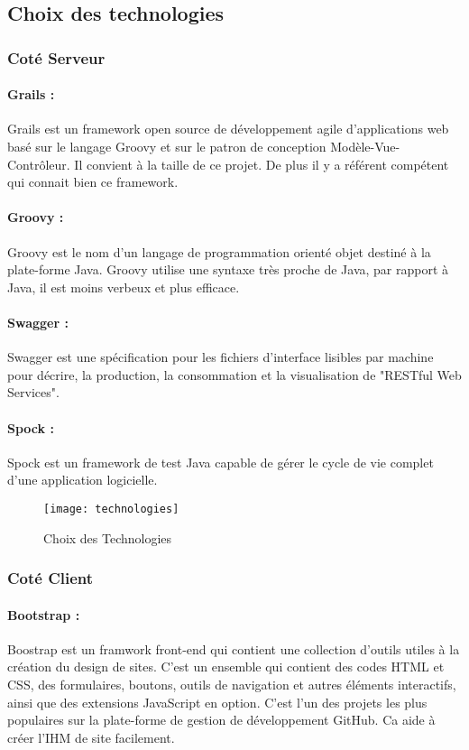 \subsection{Choix des technologies}

\subsubsection{Coté Serveur}

\paragraph{Grails :}
Grails est un framework open source de développement agile d'applications web basé sur le langage Groovy et sur le patron de conception Modèle-Vue-Contrôleur.
Il convient à la taille de ce projet.
De plus il y a référent compétent qui connait bien ce framework.
\paragraph{Groovy :}
Groovy est le nom d'un langage de programmation orienté objet destiné à la plate-forme Java.
Groovy utilise une syntaxe très proche de Java, par rapport à Java, il est moins verbeux et plus efficace.

\paragraph{Swagger :}
Swagger est une spécification pour les fichiers d'interface lisibles par machine pour décrire, la production, la consommation et la visualisation de "RESTful Web Services".
\paragraph{Spock :}
Spock est un framework de test Java capable de gérer le cycle de vie complet d'une application logicielle.

\begin{figure}[ht]
 \centering
 \texttt{[image: technologies]}
 \caption{Choix des Technologies}
 \label{fig:technologies}
\end{figure}

\subsubsection*{Coté Client}

\paragraph{Bootstrap :}
Boostrap est un framwork front-end qui contient une collection d'outils utiles à la création du design de sites.
C'est un ensemble qui contient des codes HTML et CSS, des formulaires, boutons, outils de navigation et autres éléments interactifs, ainsi que des extensions JavaScript en option. C'est l'un des projets les plus populaires sur la plate-forme de gestion de développement GitHub.
Ca aide à créer l'IHM de site facilement.

